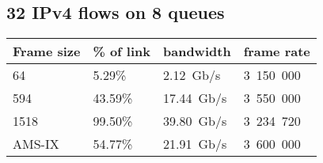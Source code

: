 
\subsection{32 IPv4 flows on 8 queues}

\begin{tabular}{ | l | l | l | l | }
\hline
Frame size & \% of link & bandwidth & frame rate \\
\hline
64     &  5.29\% &  2.12~Gb/s & 3~150~000 \\ %
594    & 43.59\% & 17.44~Gb/s & 3~550~000 \\ %
1518   & 99.50\% & 39.80~Gb/s & 3~234~720 \\ %
AMS-IX & 54.77\% & 21.91~Gb/s & 3~600~000 \\ %
\hline
\end{tabular}


